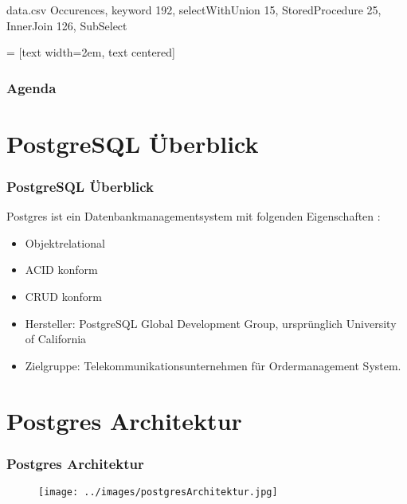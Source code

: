 \documentclass[hyperref={pdfpagelabels=false}]{beamer}
\author{Jennifer Wittling, Rolf Kimmelmann, Jan Löffelsender}
\title{\tit}
\newcommand{\pu}{PostgreSQL Überblick}
\newcommand{\parcht}{Postgres Architektur}
\newcommand{\storedproc}{Stored Procedure}
\begin{document}
\begin{filecontents}{data.csv}
{Occurences}, {keyword}
192, selectWithUnion
15, StoredProcedure
25, InnerJoin
126, SubSelect
\end{filecontents}
 = [text width=2em, text centered]

\begin{frame}
\titlepage
\end{frame} 

\begin{frame}
\frametitle{Agenda}
\hypertarget{tableofcontent}{}
\tableofcontents
\end{frame} 

\section{PostgreSQL Überblick}
	\begin{frame}
		\frametitle{\pu}
		Postgres ist ein Datenbankmanagementsystem mit folgenden Eigenschaften :
		\begin{itemize}
			\item Objektrelational
			\item ACID konform
            \item CRUD konform
            \item Hersteller: PostgreSQL Global Development Group, ursprünglich University of California
            \item Zielgruppe: Telekommunikationsunternehmen für Ordermanagement System.
		\end{itemize}
	\end{frame}

\section{Postgres Architektur}
\begin{frame}
	\frametitle{\parcht}
	\centering
	\begin{figure}
		\texttt{[image: ../images/postgresArchitektur.jpg]}
	\end{figure}
\end{frame}

    {
    
    }

%
\end{document}
